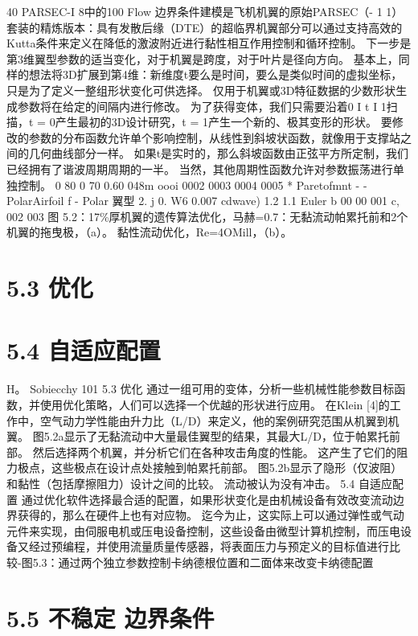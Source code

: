 \documentclass[UTF8,11pt,a4paper,openany,fontset=fandol]{ctexbook}
\begin{document}
40 PARSEC-I 8中的100 Flow 边界条件建模是飞机机翼的原始PARSEC（- 1 1）套装的精炼版本：具有发散后缘（DTE）的超临界机翼部分可以通过支持高效的Kutta条件来定义在降低的激波附近进行黏性相互作用控制和循环控制。 下一步是第3维翼型参数的适当变化，对于机翼是跨度，对于叶片是径向方向。 基本上，同样的想法将3D扩展到第4维：新维度t要么是时间，要么是类似时间的虚拟坐标，只是为了定义一整组形状变化可供选择。 仅用于机翼或3D特征数据的少数形状生成参数将在给定的间隔内进行修改。 为了获得变体，我们只需要沿着0 I t I 1扫描，t = 0产生最初的3D设计研究，t = 1产生一个新的、极其变形的形状。 要修改的参数的分布函数允许单个影响控制，从线性到斜坡状函数，就像用于支撑站之间的几何曲线部分一样。 如果t是实时的，那么斜坡函数由正弦平方所定制，我们已经拥有了谐波周期周期的一半。 当然，其他周期性函数允许对参数振荡进行单独控制。 0 80 0 70 0.60 048m oooi 0002 0003 0004 0005 * Paretofmnt - - PolarAirfoil f - Polar 翼型 2. j 0. W6 0.007 cdwave) 1.2 1.1 Euler b 00 00 001 c, 002 003 图 5.2：17\%厚机翼的遗传算法优化，马赫=0.7：无黏流动帕累托前和2个机翼的拖曳极，（a）。 黏性流动优化，Re=4OMill，（b）。

\section{5.3 优化}
\section{5.4 自适应配置}
H。 Sobiecchy 101 5.3 优化 通过一组可用的变体，分析一些机械性能参数目标函数，并使用优化策略，人们可以选择一个优越的形状进行应用。 在Klein [4]的工作中，空气动力学性能由升力比（L/D）来定义，他的案例研究范围从机翼到机翼。 图5.2a显示了无黏流动中大量最佳翼型的结果，其最大L/D，位于帕累托前部。 然后选择两个机翼，并分析它们在各种攻击角度的性能。 这产生了它们的阻力极点，这些极点在设计点处接触到帕累托前部。 图5.2b显示了隐形（仅波阻）和黏性（包括摩擦阻力）设计之间的比较。 流动被认为没有冲击。 5.4 自适应配置 通过优化软件选择最合适的配置，如果形状变化是由机械设备有效改变流动边界获得的，那么在硬件上也有对应物。 迄今为止，这实际上可以通过弹性或气动元件来实现，由伺服电机或压电设备控制，这些设备由微型计算机控制，而压电设备又经过预编程，并使用流量质量传感器，将表面压力与预定义的目标值进行比较-图5.3：通过两个独立参数控制卡纳德根位置和二面体来改变卡纳德配置

\section{5.5 不稳定 边界条件}
\end{document}
